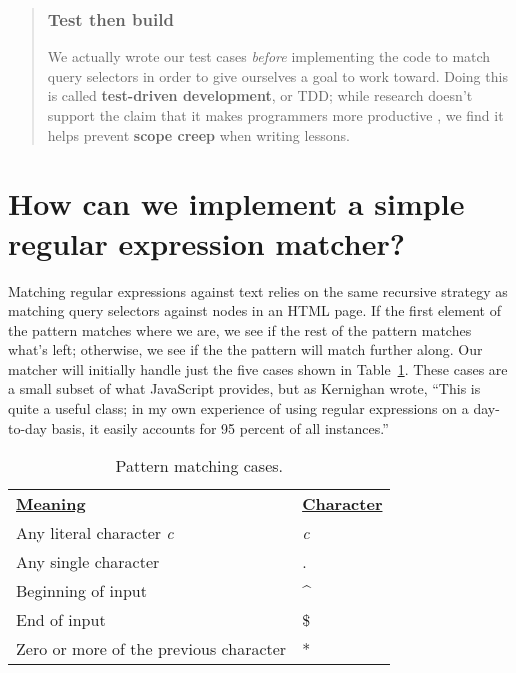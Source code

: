 \documentclass[krantzl]{krantz}
\newcommand{\tblref}[1]{Table~\ref{#1}}
\newcommand{\glossref}[1]{\textbf{#1}}
\newenvironment{callout}{\savenotes\begin{tBox}\begin{quotation}\toggletrue{inbox}\renewcommand{\thempfootnote}{\arabic{footnote}}}{\end{quotation}\vspace{\baselineskip}\end{tBox}\togglefalse{inbox}\spewnotes}
\begin{document}
\begin{callout}


\subsubsection*{Test then build}


We actually wrote our test cases \emph{before} implementing the code to match query selectors
in order to give ourselves a goal to work toward.
Doing this is called \glossref{test-driven development}, or TDD;
while research doesn’t support the claim that
it makes programmers more productive \cite{Fucci2016,Fucci2017},
we find it helps prevent \glossref{scope creep} when writing lessons.

\end{callout}

\section{How can we implement a simple regular expression matcher?}\label{pattern-matching-re}


Matching regular expressions against text relies on the same recursive strategy
as matching query selectors against nodes in an HTML page.
If the first element of the pattern matches where we are,
we see if the rest of the pattern matches what’s left;
otherwise,
we see if the the pattern will match further along.
Our matcher will initially handle just the five cases shown in
\tblref{pattern-matching-cases}.
These cases are a small subset of what JavaScript provides,
but as Kernighan wrote,
“This is quite a useful class;
in my own experience of using regular expressions on a day-to-day basis,
it easily accounts for 95 percent of all instances.”

\begin{table}[h]
\begin{tabular}{ll}
\textbf{\underline{Meaning}} & \textbf{\underline{Character}} \\
Any literal character \emph{c} & \emph{c} \\
Any single character & . \\
Beginning of input & {\textasciicircum} \\
End of input & \$ \\
Zero or more of the previous character & * \\
\end{tabular}
\caption{Pattern matching cases.}
\label{pattern-matching-cases}
\end{table}
\end{document}
